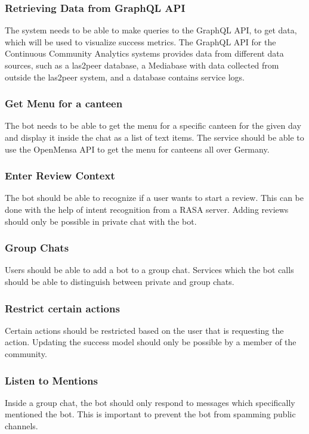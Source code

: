 \subsubsection{Retrieving Data from GraphQL API}
The system needs to be able to make queries to the GraphQL API, to get data, which will be used to visualize success metrics. The GraphQL API  for the Continuous Community Analytics systems provides data from different data sources, such as a las2peer database, a Mediabase with data collected from outside the las2peer system, and a database contains service logs.

\subsubsection{Get Menu for a canteen} The bot needs to be able to get the menu for a specific canteen for the given day and display it inside the chat as a list of text items. The service should be able to use the OpenMensa API \footnotemark to get the menu for canteens all over Germany.


\subsubsection{Enter Review Context} The bot should be able to recognize if a user wants to start a review. This can be done with the help of intent recognition from a RASA server. Adding reviews should only be possible in private chat with the bot.

\subsubsection{Group Chats} Users should be able to add a bot to a group chat. Services which the bot calls should be able to distinguish between private and group chats.

\subsubsection{Restrict certain actions}
Certain actions should be restricted based on the user that is requesting the action. Updating the success model should only be possible by a member of the community.

\subsubsection{Listen to Mentions} Inside a group chat, the bot should only respond to messages which specifically mentioned the bot. This is important to prevent the bot from spamming public channels.

